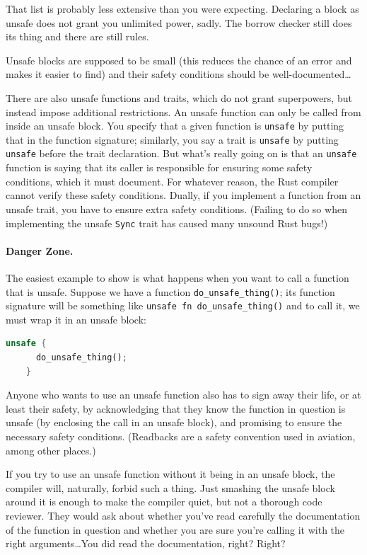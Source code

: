 That list is probably less extensive than you were expecting. Declaring a block as unsafe does not grant you unlimited power, sadly. The borrow checker still does its thing and there are still rules. 

Unsafe blocks are supposed to be small (this reduces the chance of an error and makes it easier to find) and their safety conditions should be well-documented\ldots

There are also unsafe functions and traits, which do not grant superpowers, but instead impose additional restrictions. An unsafe function can only be called from inside an unsafe block. 
You specify that a given function is \texttt{unsafe} by putting that in the function signature; similarly, you say a trait is \texttt{unsafe} by putting \texttt{unsafe} before the trait declaration.
But what's really going on is that an \texttt{unsafe} function is saying that its caller is responsible for ensuring some safety conditions, which it must document. For whatever reason,
the Rust compiler cannot verify these safety conditions. Dually, if you implement a function from an unsafe trait, you have to ensure extra safety conditions. (Failing to do so
when implementing the unsafe \texttt{Sync} trait has caused many unsound Rust bugs!)

\paragraph{Danger Zone.} The easiest example to show is what happens when you want to call a function that is unsafe. Suppose we have a function \texttt{do\_unsafe\_thing()}; its function signature will be something like \texttt{unsafe fn do\_unsafe\_thing()} and to call it, we must wrap it in an unsafe block:

\begin{lstlisting}[language=Rust]
    unsafe {
      do_unsafe_thing();
    }
\end{lstlisting}

Anyone who wants to use an unsafe function also has to sign away their life, or at least their safety, by acknowledging that they know the function in question is unsafe (by enclosing the call in an
unsafe block), and promising to ensure the necessary safety conditions. (Readbacks are a safety convention used in aviation, among other places.)

If you try to use an unsafe function without it being in an unsafe block, the compiler will, naturally, forbid such a thing. Just smashing the unsafe block around it is enough to make the compiler quiet, but not a thorough code reviewer. They would ask about whether you've read carefully the documentation of the function in question and whether you are sure you're calling it with the right arguments\ldots You did read the documentation, right? Right?

